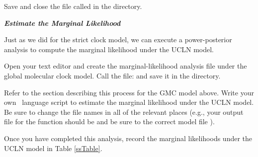 {\begin{framed}
Save and close the file called {\textcolor{red}{}} in the  directory.
\end{framed}}



\textbf{\textit{Estimate the Marginal Likelihood}}

Just as we did for the strict clock model, we can execute a power-posterior analysis to compute the marginal likelihood under the UCLN model. 

{\begin{framed}
Open your text editor and create the marginal-likelihood analysis file under the global molecular clock model. Call the file: {\textcolor{red}{}} and save it in the  directory.
\end{framed}}

Refer to the section describing this process for the GMC model above.
Write your own \Rev~language script to estimate the marginal likelihood under the UCLN model. 
Be sure to change the file names in all of the relevant places (e.g., your output file for the  function should be \colorbox{shadecolor}{} and be sure to  the correct model file \colorbox{shadecolor}{}).

{\begin{framed}
Once you have completed this analysis, record the marginal likelihoods under the UCLN model in Table \ref{ssTable}.
\end{framed}}

